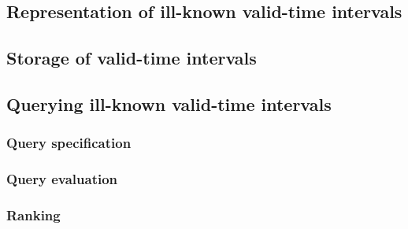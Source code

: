 

\subsection{Representation of ill-known valid-time intervals}

\subsection{Storage of valid-time intervals}

\subsection{Querying ill-known valid-time intervals}

\subsubsection{Query specification}

\subsubsection{Query evaluation}

\subsubsection{Ranking}